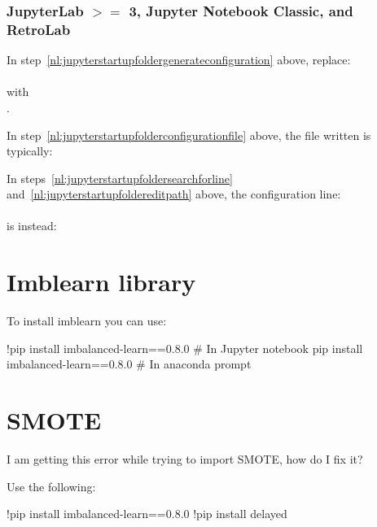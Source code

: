 	\subsubsection{JupyterLab \texorpdfstring{$>=$}{>=} 3, Jupyter Notebook Classic, and RetroLab}
	\begin{bulletedlist}
		\item In step~\ref{nl:jupyterstartupfoldergenerateconfiguration} above, replace:\\ \\ with\\ .
		\item In step~\ref{nl:jupyterstartupfolderconfigurationfile} above, the file written is typically:\\ 

		\item In steps~\ref{nl:jupyterstartupfoldersearchforline} and~\ref{nl:jupyterstartupfoldereditpath} above, the configuration line:\\ \\ is instead:\\ 
	\end{bulletedlist}


	\section{Imblearn library}
To install imblearn you can use:
	\begin{code}[\codenumbering]{}
		\codeitemnonumber !pip install imbalanced-learn==0.8.0 \# In Jupyter notebook
		\codeitemnonumber pip install imbalanced-learn==0.8.0 \# In anaconda prompt
	\end{code}


	\section{SMOTE}
I am getting this error while trying to import SMOTE, how do I fix it?

\noindent{}

Use the following:
	\begin{code}[\codenumbering]{}
		\codeitemnonumber !pip install imbalanced-learn==0.8.0
		\codeitemnonumber !pip install delayed
	\end{code}


